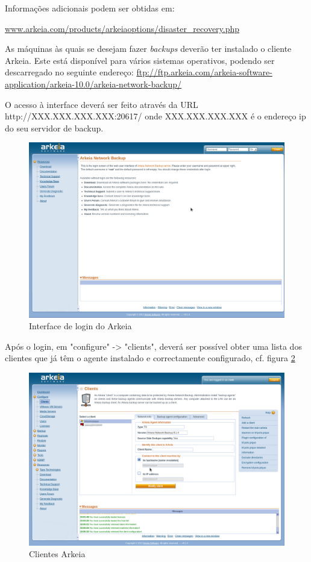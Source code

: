 Informações adicionais podem ser obtidas em:\\ \begin{normalsize}\sffamily\href{http://www.arkeia.com/products/arkeiaoptions/disaster\_recovery.php}{www.arkeia.com/products/arkeiaoptions/disaster\_recovery.php}\end{normalsize}

As máquinas às quais se desejam fazer \textit{backups} deverão ter instalado o cliente Arkeia. Este está disponível para vários sistemas operativos, podendo ser descarregado no seguinte endereço: \url{ftp://ftp.arkeia.com/arkeia-software-application/arkeia-10.0/arkeia-network-backup/}

O acesso à interface deverá ser feito através da URL http://XXX.XXX.XXX.XXX:20617/ onde XXX.XXX.XXX.XXX é o endereço ip do seu servidor de backup.

\begin{figure}[H]
    \begin{center}
        \includegraphics[width=15cm]{include/img/arkeia1.png}
    \end{center}
    \caption{Interface de login do Arkeia}
    \label{fig:arkeia1}
\end{figure}

Após o login, em "configure" -> "clients", deverá ser possível obter uma lista dos clientes que já têm o agente instalado e correctamente configurado, cf. figura \ref{fig:arkeia2}

\begin{figure}[H]
    \begin{center}
        \includegraphics[width=15cm]{include/img/arkeia2.png}
    \end{center}
    \caption{Clientes Arkeia}
    \label{fig:arkeia2}
\end{figure}
